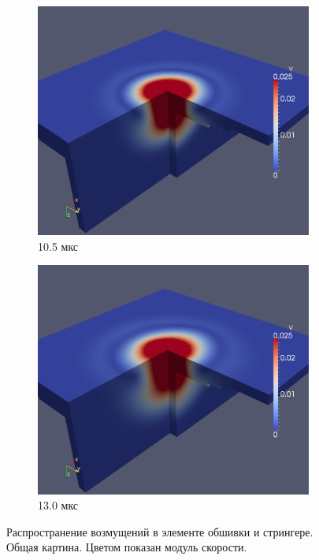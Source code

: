 \begin{figure}[htp]
\begin{subfigure}[b]{0.5\textwidth}
\centering
\includegraphics[width=\textwidth]{png/pkm-experiment/wing-stringer/wave-3d/v-0017.png}
\caption{10.5 мкс}
\end{subfigure}
\begin{subfigure}[b]{0.5\textwidth}
\centering
\includegraphics[width=\textwidth]{png/pkm-experiment/wing-stringer/wave-3d/v-0021.png}
\caption{13.0 мкс}
\end{subfigure}
\caption{Распространение возмущений в элементе обшивки и стрингере. Общая картина. Цветом показан модуль скорости.}
\label{pic:pkm_experiment_v3d_wing_stringer}
\end{figure}

